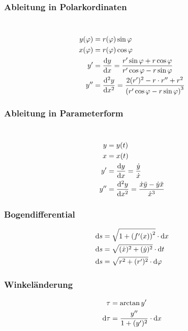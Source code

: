 \begin{multicols}{2}
\subsubsection*{Ableitung in Polarkordinaten}
\\
\begin{align*} 
y(\varphi)&=r(\varphi)\sin\varphi\\
x(\varphi)&=r(\varphi)\cos\varphi\\
y'&=\frac{\mathop{}\!\mathrm{d} y}{\mathop{}\!\mathrm{d} x}=\frac{r'\sin\varphi+r\cos\varphi}{r'\cos\varphi-r\sin\varphi}\\
y''&=\frac{\mathop{}\!\mathrm{d}^2 y}{\mathop{}\!\mathrm{d} x^2}=\frac{2(r')^2-r\cdot r''+r^2}{\left(r'\cos\varphi-r\sin\varphi\right)^3}
\end{align*}
\vfill
\subsubsection*{Ableitung in Parameterform}
\\
\begin{align*} 
y&=y(t)\\
x&=x(t)\\
y'&=\frac{\mathop{}\!\mathrm{d} y}{\mathop{}\!\mathrm{d} x}=\frac{\dot{y}}{\dot{x}}\\
y''&=\frac{\mathop{}\!\mathrm{d}^2 y}{\mathop{}\!\mathrm{d} x^2}=\frac{\dot{x}\ddot{y}-\dot{y}\ddot{x}}{\dot{x}^3}
\end{align*}
\vfill
\end{multicols}

\begin{multicols}{2}
\subsubsection*{Bogendifferential}
\begin{align*} 
\mathop{}\!\mathrm{d} s&=\sqrt{1+\left(f'(x)\right)^2}\cdot \mathop{}\!\mathrm{d} x\\
\mathop{}\!\mathrm{d} s&=\sqrt{(\dot{x})^2+(\dot{y})^2}\cdot \mathop{}\!\mathrm{d} t\\
\mathop{}\!\mathrm{d} s&=\sqrt{r^2+(r')^2}\cdot \mathop{}\!\mathrm{d} \varphi
\end{align*}
\subsubsection*{Winkeländerung}
\begin{align*} 
\tau&=\arctan y'\\
\mathop{}\!\mathrm{d} \tau&=\frac{y''}{1+(y')^2}\cdot \mathop{}\!\mathrm{d} x
\end{align*}
\vspace{5mm}
\vfill
\end{multicols}


